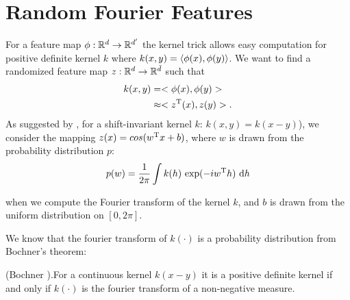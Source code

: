 \documentclass[twoside]{memoir}
\begin{document}
\pagebreak

\section{Random Fourier Features} \label{sec:RFFs}
For a feature map $\phi: \mathbb{R}^d \rightarrow \mathbb{R}^{d'}$ the kernel trick allows easy computation for positive definite kernel $k$ where $k(x,y) = \langle\phi(x),\phi(y)\rangle$. We want to find a randomized feature map $z: \mathbb{R}^d \rightarrow \mathbb{R}^{\bar{d}}$ such that 
\begin{equation*}
\begin{split}
k(x,y) &= <\phi(x), \phi(y)> \\
&\approx <z^{\text{T}}(x), z(y)>.
\end{split}
\end{equation*}
As suggested by \cite{RFF_Rahimi}, for a shift-invariant kernel $k$: $k(x, y) = k(x - y)$), we consider the mapping $z(x) = cos(w^{\text{T}}x + b)$, where $w$ is drawn from the probability distribution $p$:
\begin{equation}
p(w) = \frac{1}{2\pi} \int k(h) ~ \text{exp}(-iw^{\text{T}}h) ~ \text{d}h
\label{eq:probFourier}
\end{equation} 

when we compute the Fourier transform of the kernel $k$, and $b$ is drawn from the uniform distribution on $[0, 2\pi]$.

We know that the fourier transform of $k(\cdot)$ is a probability distribution from Bochner's theorem:
\begin{thm} \label{thm:Bochner}
	(Bochner \cite{Rudin_1990}).For a continuous kernel $k(x - y)$  it is a positive definite kernel if and only if $k(\cdot)$ is the fourier transform of a non-negative measure.
\end{thm}
\end{document}
